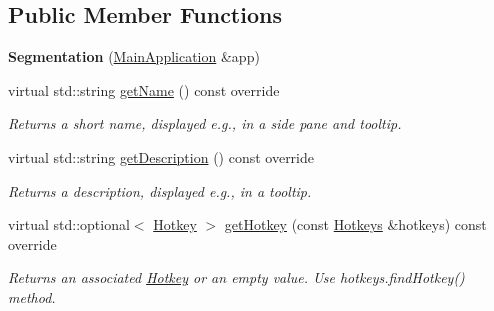 \subsection*{Public Member Functions}
\begin{DoxyCompactItemize}
\item 
\mbox{\label{classpepr3d_1_1_segmentation_a5717e5e9983faa1e33b9008a97aae787}} 
{\bfseries Segmentation} (\mbox{\hyperlink{classpepr3d_1_1_main_application}{Main\+Application}} \&app)
\item 
\mbox{\label{classpepr3d_1_1_segmentation_a992852fd1abddc360051ec6af862c75f}} 
virtual std\+::string \mbox{\hyperlink{classpepr3d_1_1_segmentation_a992852fd1abddc360051ec6af862c75f}{get\+Name}} () const override
\begin{DoxyCompactList}\small\item\em Returns a short name, displayed e.\+g., in a side pane and tooltip. \end{DoxyCompactList}\item 
\mbox{\label{classpepr3d_1_1_segmentation_af2c28c0bff05165c8283e3727e09f726}} 
virtual std\+::string \mbox{\hyperlink{classpepr3d_1_1_segmentation_af2c28c0bff05165c8283e3727e09f726}{get\+Description}} () const override
\begin{DoxyCompactList}\small\item\em Returns a description, displayed e.\+g., in a tooltip. \end{DoxyCompactList}\item 
\mbox{\label{classpepr3d_1_1_segmentation_a6e48ed1de1808a831027cea1bb3c4332}} 
virtual std\+::optional$<$ \mbox{\hyperlink{structpepr3d_1_1_hotkey}{Hotkey}} $>$ \mbox{\hyperlink{classpepr3d_1_1_segmentation_a6e48ed1de1808a831027cea1bb3c4332}{get\+Hotkey}} (const \mbox{\hyperlink{classpepr3d_1_1_hotkeys}{Hotkeys}} \&hotkeys) const override
\begin{DoxyCompactList}\small\item\em Returns an associated \mbox{\hyperlink{structpepr3d_1_1_hotkey}{Hotkey}} or an empty value. Use hotkeys.\+find\+Hotkey() method. \end{DoxyCompactList}\item 
\mbox{\label{classpepr3d_1_1_segmentation_af67898a59f818d71a97069b2fe62bd25}} 

\end{DoxyCompactItemize}

